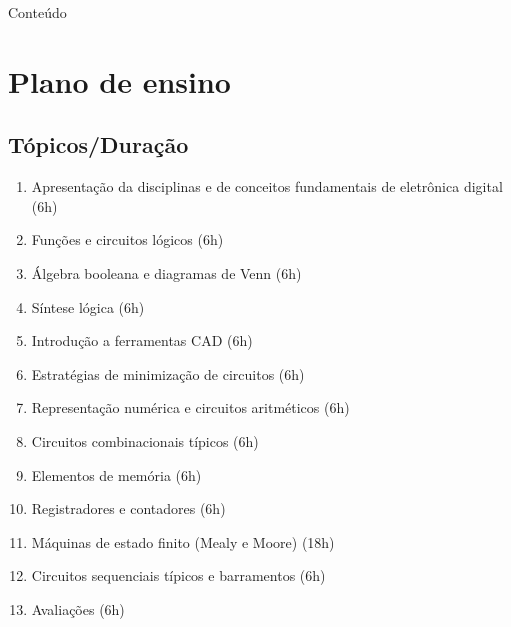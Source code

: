 


\subtitle{Apresentação da Disciplina} %


 
\begin{frame}
	\titlepage
\end{frame} 

\begin{frame}{Conteúdo}
    \begin{multicols}{2}
    	\tableofcontents[sections=1]%
    	\columnbreak
    	\tableofcontents[sections=2-]
    	\vfill\null
    \end{multicols}
\end{frame}

\section{Plano de ensino} %



\subsection{Tópicos/Duração} %


\begin{frame}{\insertsubsection} %
   \begin{multicols}{2}
	\begin{enumerate}
		\item Apresentação da disciplinas e de conceitos fundamentais de eletrônica digital (6h)
		\item Funções e circuitos lógicos (6h)
		\item Álgebra booleana e diagramas de Venn (6h)
		\item Síntese lógica (6h)
		\item Introdução a ferramentas CAD (6h)
		\item Estratégias de minimização de circuitos (6h)
		\item Representação numérica e circuitos aritméticos (6h)
		\item Circuitos combinacionais típicos (6h)
		\framebreak
		\item Elementos de memória (6h)
		\item Registradores e contadores (6h)
		\item Máquinas de estado finito (Mealy e Moore) (18h)
		\item Circuitos sequenciais típicos e barramentos (6h)
		\item Avaliações (6h)
    \end{enumerate}
    \end{multicols}
\end{frame}

